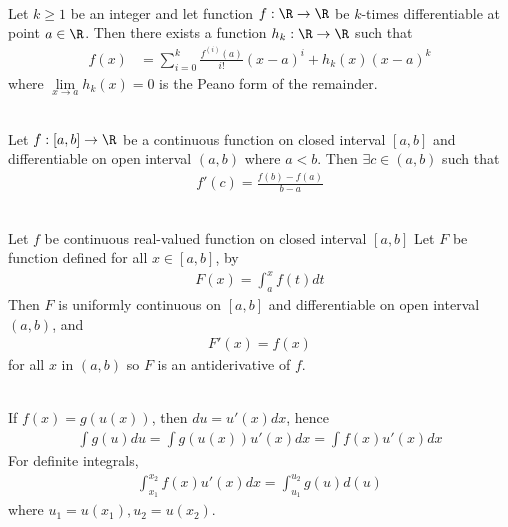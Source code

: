 \begin{theorem} \\
Let $k \geq 1$ be an integer and let function $f: \R \rightarrow \R$ be $k$-times differentiable at point $a \in \R$. Then there exists a function $h_k: \R \rightarrow \R$ such that
\begin{align}
f(x) &= \sum\limits_{i=0}^k \frac{f^{(i)}(a)}{i!} (x-a)^i + h_k (x) (x-a)^k \nonumber
\end{align}
where $\lim\limits_{x \rightarrow a} h_k(x) = 0$ is the Peano form of the remainder.
\end{theorem}

\begin{theorem} \\
Let $f: [a,b] \rightarrow \R$ be a continuous function on closed interval $[a,b]$ and differentiable on open interval $(a,b)$ where $a < b$. Then $\exists c \in (a,b)$ such that
\begin{align}
f'(c) = \frac{f(b) - f(a)}{b-a} \nonumber
\end{align}
\end{theorem}

\begin{theorem} \\
Let $f$ be continuous real-valued function on closed interval $[a,b]$ Let $F$ be function defined for all $x \in [a,b]$, by
\begin{align}
F(x) = \int_{a}^x f(t) dt \nonumber
\end{align}
Then $F$ is uniformly continuous on $[a,b]$ and differentiable on open interval $(a,b)$, and
\begin{align}
F'(x) = f(x) \nonumber
\end{align}
for all $x$ in $(a,b)$ so $F$ is an antiderivative of $f$.
\end{theorem}

\begin{remark} \\
If $f(x) = g(u(x))$, then $du = u'(x) dx$, hence
\begin{align}
\int g(u) du = \int g(u(x)) u'(x) dx = \int f(x) u'(x) dx \nonumber
\end{align}
For definite integrals,
\begin{align}
\int_{x_1}^{x_2} f(x) u'(x) dx = \int_{u_1}^{u_2} g(u) d(u) \nonumber
\end{align}
where $u_1 = u(x_1), u_2 = u(x_2)$.
\end{remark}

